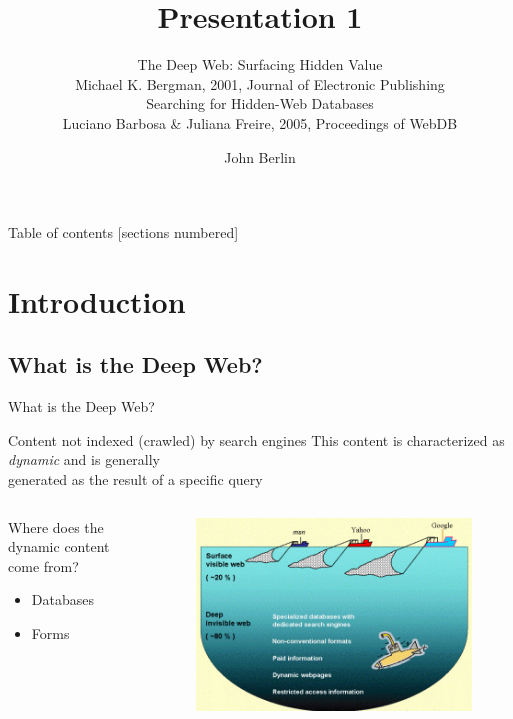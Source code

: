 \documentclass{beamer}
\author{John Berlin}
\subtitle{
\normalsize{The Deep Web: Surfacing Hidden Value} \\  \footnotesize{Michael K. Bergman},  2001, Journal of Electronic Publishing\\ 
\normalsize{Searching for Hidden-Web Databases} \\ \footnotesize{Luciano Barbosa \& Juliana Freire}, 2005, Proceedings of WebDB
}
\title{Presentation 1}
\institute{Old Dominion University \\ Introduction to Information Retrieval \\ CS734/834   }
\begin{document}
\maketitle

\begin{frame}{Table of contents}
  [sections numbered]
  \tableofcontents[hideallsubsections]
\end{frame}



\section{Introduction}

\subsection{What is the Deep Web?}

\begin{frame}[fragile]{What is the Deep Web?}
	\begin{block}{Content not indexed (\alert{crawled}) by search engines}
	This content is characterized as \emph{dynamic} and is generally \\
	generated as the result of a specific query
  \end{block}
   \begin{columns}[T,onlytextwidth]
		\begin{block}{Where does the dynamic content come from?}
			\begin{itemize}
     			  \item Databases
   				 \item Forms
  			\end{itemize}
  		\end{block}
  		\begin{figure}
			\includegraphics[scale=0.3]{invisible-web.gif}
		\end{figure}
  \end{columns}
\end{frame}
\end{document}
